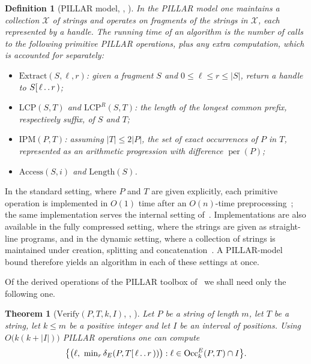 \documentclass[10pt]{article}
\newtheorem{definition}{Definition}
\newtheorem{theorem}{Theorem}
\newcommand{\dE}{\delta_E}
\newcommand{\Occ}{\operatorname{Occ}^E}
\newcommand{\PILLAR}{\textnormal{PILLAR}}
\newcommand{\per}{\operatorname{per}}
\begin{document}
\begin{definition}[\PILLAR{} model, {\cite{CKW20}}, {\cite[Section 2.1]{CKW22}}]\label{def:pillar}
In the \PILLAR{} model one maintains a collection $\mathcal X$ of strings and
operates on fragments of the strings in $\mathcal X$, each represented by a
handle. The running time of an algorithm is the number of calls to the
following \emph{primitive \PILLAR{} operations}, plus any extra computation,
which is accounted for separately:
\begin{itemize}
    \item $\mathrm{Extract}(S,\ell,r)$: given a fragment $S$ and
    $0\le\ell\le r\le|S|$, return a handle to $S[\,\ell\mathinner{.\,.}r\,)$;
    \item $\mathrm{LCP}(S,T)$ and $\mathrm{LCP}^R(S,T)$: the length of the
    longest common prefix, respectively suffix, of $S$ and $T$;
    \item $\mathrm{IPM}(P,T)$: assuming $|T|\le2|P|$, the set of exact
    occurrences of $P$ in $T$, represented as an arithmetic progression with
    difference $\per(P)$;
    \item $\mathrm{Access}(S,i)$ and $\mathrm{Length}(S)$.
\end{itemize}
\end{definition}

In the standard setting, where $P$ and $T$ are given explicitly, each primitive
operation is implemented in $O(1)$ time after an $O(n)$-time
preprocessing~\cite[Section 7.1]{CKW22}; the same implementation serves the
internal setting of~\cite{KRRW15}. Implementations are also available in the
fully compressed setting, where the strings are given as straight-line
programs, and in the dynamic setting, where a collection of strings is
maintained under creation, splitting and concatenation~\cite[Sections 7.2,
7.3]{CKW22}. A \PILLAR{}-model bound therefore yields an algorithm in each of
these settings at once.

Of the derived operations of the \PILLAR{} toolbox of~\cite{CKW20} we shall
need only the following one.

\begin{theorem}[$\mathrm{Verify}(P,T,k,I)$, {\cite[Section 5]{CH02}},
{\cite[Fact 2.9]{CKW22}}]\label{thm:verify}
Let $P$ be a string of length $m$, let $T$ be a string, let $k\le m$ be a
positive integer and let $I$ be an interval of positions. Using
$O\bigl(k(k+|I|)\bigr)$ \PILLAR{} operations one can compute
\[
\bigl\{\bigl(\ell,\ \textstyle\min_{r}\dE(P,T[\,\ell\mathinner{.\,.}r\,))\bigr):
\ell\in\Occ_k(P,T)\cap I\bigr\}.
\]
\end{theorem}
\end{document}
